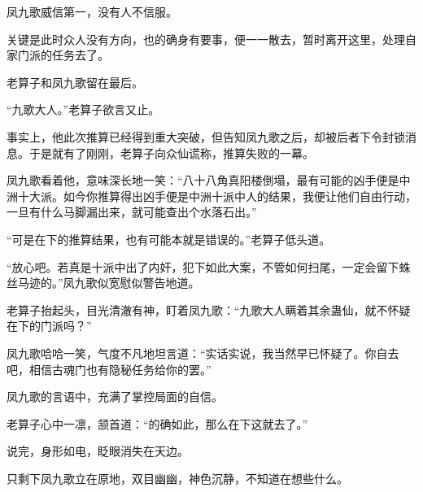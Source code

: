 \begin{this_body}
凤九歌威信第一，没有人不信服。

关键是此时众人没有方向，也的确身有要事，便一一散去，暂时离开这里，处理自家门派的任务去了。

老算子和凤九歌留在最后。

“九歌大人。”老算子欲言又止。

事实上，他此次推算已经得到重大突破，但告知凤九歌之后，却被后者下令封锁消息。于是就有了刚刚，老算子向众仙谎称，推算失败的一幕。

凤九歌看着他，意味深长地一笑：“八十八角真阳楼倒塌，最有可能的凶手便是中洲十大派。如今你推算得出凶手便是中洲十派中人的结果，我便让他们自由行动，一旦有什么马脚漏出来，就可能查出个水落石出。”

“可是在下的推算结果，也有可能本就是错误的。”老算子低头道。

“放心吧。若真是十派中出了内奸，犯下如此大案，不管如何扫尾，一定会留下蛛丝马迹的。”凤九歌似宽慰似警告地道。

老算子抬起头，目光清澈有神，盯着凤九歌：“九歌大人瞒着其余蛊仙，就不怀疑在下的门派吗？”

凤九歌哈哈一笑，气度不凡地坦言道：“实话实说，我当然早已怀疑了。你自去吧，相信古魂门也有隐秘任务给你的罢。”

凤九歌的言语中，充满了掌控局面的自信。

老算子心中一凛，颔首道：“的确如此，那么在下这就去了。”

说完，身形如电，眨眼消失在天边。

只剩下凤九歌立在原地，双目幽幽，神色沉静，不知道在想些什么。

\end{this_body}

